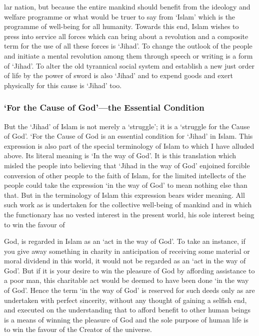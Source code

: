 lar nation, but because the entire mankind should benefit from the
ideology and welfare programme or what would be truer to say from
`Islam' which is the programme of well-being for all humanity. Towards
this end, Islam wishes to press into service all forces which can bring
about a revolution and a composite term for the use of all these forces
is `Jihad'. To change the outlook of the people and initiate a mental
revolution among them through speech or writing is a form of `Jihad'. To
alter the old tyrannical social system and establish a new just order of
life by the power of sword is also `Jihad' and to expend goods and exert
physically for this cause is `Jihad' too.

\hypertarget{for-the-cause-of-godthe-essential-condition}{%
\subsubsection{`For the Cause of God'---the Essential
Condition}\label{for-the-cause-of-godthe-essential-condition}}

But the `Jihad' of Islam is not merely a `struggle'; it is a `struggle
for the Cause of God'. `For the Cause of God is an essential condition
for `Jihad' in Islam. This expression is also part of the special
terminology of Islam to which I have alluded above. Its literal meaning
is `In the way of God'. It is this translation which misled the people
into believing that `Jihad in the way of God' enjoined forcible
conversion of other people to the faith of Islam, for the limited
intellects of the people could take the expression `in the way of God'
to mean nothing else than that. But in the terminology of Islam this
expression bears wider meaning. All such work as is undertaken for the
collective well-being of mankind and in which the functionary has no
vested interest in the present world, his sole interest being to win the
favour of

God, is regarded in Islam as an `act in the way of God'. To take an
instance, if you give away something in charity in anticipation of
receiving some material or moral dividend in this world, it would not be
regarded as an `act in the way of God'. But if it is your desire to win
the pleasure of God by affording assistance to a poor man, this
charitable act would be deemed to have been done `in the way of God'.
Hence the term `in the way of God' is reserved for such deeds only as
are undertaken with perfect sincerity, without any thought of gaining a
selfish end, and executed on the understanding that to afford benefit to
other human beings is a means of winning the pleasure of God and the
sole purpose of human life is to win the favour of the Creator of the
universe.

